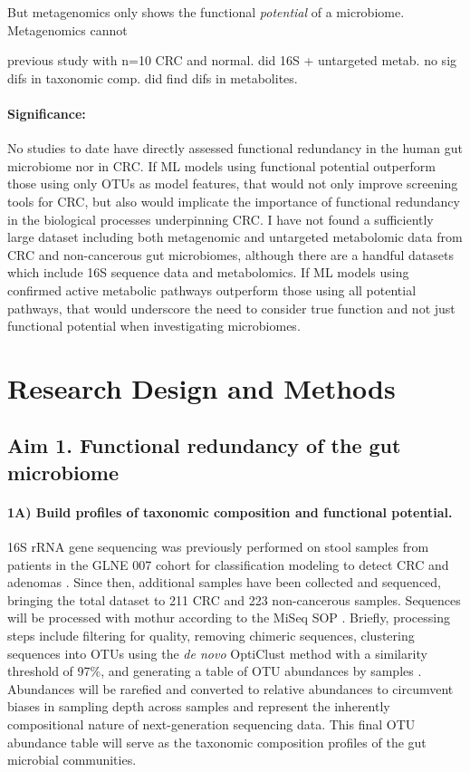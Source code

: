 \documentclass[11pt]{article}
\begin{document}
But metagenomics only shows the functional \textit{potential} of a microbiome.
Metagenomics cannot

previous study with n=10 CRC and normal. did 16S + untargeted metab. no sig difs in taxonomic comp. did find difs in metabolites. \cite{weir_stool_2013}

\paragraph{Significance:} %
No studies to date have directly assessed functional redundancy in the human gut microbiome nor in CRC.
If ML models using functional potential outperform those using only OTUs as model features,
that would not only improve screening tools for CRC,
but also would implicate the importance of functional redundancy in the biological processes underpinning CRC.
I have not found a sufficiently large dataset including both metagenomic and untargeted metabolomic data from CRC and non-cancerous gut microbiomes, although there are a handful datasets which include 16S sequence data and metabolomics.
If ML models using confirmed active metabolic pathways outperform those using all potential pathways,
that would underscore the need to consider true function and not just functional potential when investigating microbiomes.

\section*{Research Design and Methods}

\subsection*{Aim 1. Functional redundancy of the gut microbiome}

\paragraph{1A) Build profiles of taxonomic composition and functional potential.}

16S rRNA gene sequencing was previously performed on stool samples from patients in the GLNE 007 cohort for classification modeling to detect CRC and adenomas \cite{baxter_microbiota-based_2016}.
Since then, additional samples have been collected and sequenced, bringing the total dataset to 211 CRC and 223 non-cancerous samples.
Sequences will be processed with mothur according to the MiSeq SOP \cite{schloss_introducing_2009, kozich_development_2013}.
Briefly, processing steps include filtering for quality, removing chimeric sequences, clustering sequences into OTUs using the \textit{de novo} OptiClust method with a similarity threshold of 97\%,
and generating a table of OTU abundances by samples \cite{westcott_opticlust_2017}.
Abundances will be rarefied and converted to relative abundances to circumvent biases in sampling depth across samples and represent the inherently compositional nature of next-generation sequencing data.
This final OTU abundance table will serve as the taxonomic composition profiles of the gut microbial communities.
\end{document}
